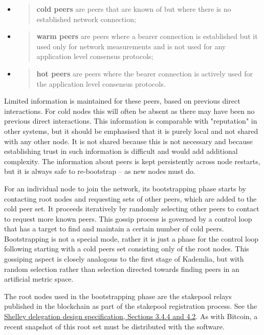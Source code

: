 \documentclass[11pt,a4paper]{article}
\begin{document}
\begin{itemize}
\item
  \begin{quote}
  \textbf{cold peers} are peers that are known of but where there is no
  established network connection;
  \end{quote}
\item
  \begin{quote}
  \textbf{warm peers} are peers where a bearer connection is established
  but it used only for network measurements and is not used for any
  application level consensus protocols;
  \end{quote}
\item
  \begin{quote}
  \textbf{hot peers} are peers where the bearer connection is actively
  used for the application level consensus protocols.
  \end{quote}
\end{itemize}

Limited information is maintained for these peers, based on previous
direct interactions. For cold nodes this will often be absent as there
may have been no previous direct interactions. This information is
comparable with "reputation" in other systems, but it should be
emphasised that it is purely local and not shared with any other node.
It is not shared because this is not necessary and because establishing
trust in such information is difficult and would add additional
complexity. The information about peers is kept persistently across node
restarts, but it is always safe to re-bootstrap -- as new nodes must do.

For an individual node to join the network, its bootstrapping phase
starts by contacting root nodes and requesting sets of other peers,
which are added to the cold peer set. It proceeds iteratively by
randomly selecting other peers to contact to request more known peers.
This gossip process is governed by a control loop that has a target to
find and maintain a certain number of cold peers. Bootstrapping is not a
special mode, rather it is just a phase for the control loop following
starting with a cold peers set consisting only of the root nodes. This
gossiping aspect is closely analogous to the first stage of Kademlia,
but with random selection rather than selection directed towards finding
peers in an artificial metric space.

The root nodes used in the bootstrapping phase are the stakepool relays
published in the blockchain as part of the stakepool registration
process. See the
\href{https://hydra.iohk.io/job/Cardano/cardano-ledger-specs/delegationDesignSpec/latest/download-by-type/doc-pdf/delegation_design_spec}{{Shelley
delegation design specification, Sections 3.4.4 and 4.2}}. As with
Bitcoin, a recent snapshot of this root set must be distributed with the
software.
\end{document}
